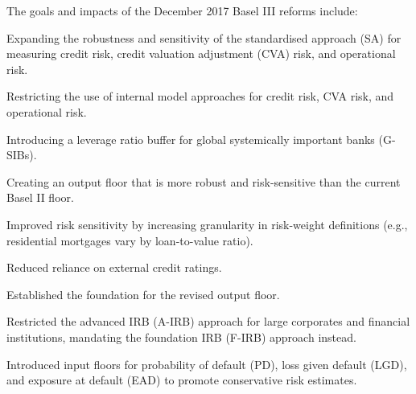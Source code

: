 

The goals and impacts of the December 2017 Basel III reforms include:

\begin{lettered}
\item Expanding the robustness and sensitivity of the standardised approach (SA)
for measuring credit risk, credit valuation adjustment (CVA) risk, and
operational risk.
\item Restricting the use of internal model approaches for credit risk, CVA risk,
and operational risk.
\item Introducing a leverage ratio buffer for global systemically important banks
(G-SIBs).
\item Creating an output floor that is more robust and risk-sensitive than the
current Basel II floor.
\end{lettered}


\begin{lettered}
\item Improved risk sensitivity by increasing granularity in risk-weight
definitions (e.g., residential mortgages vary by loan-to-value ratio).
\item Reduced reliance on external credit ratings.
\item Established the foundation for the revised output floor.
\end{lettered}

\begin{lettered}
\item Restricted the advanced IRB (A-IRB) approach for large corporates and
financial institutions, mandating the foundation IRB (F-IRB) approach instead.
\item Introduced input floors for probability of default (PD), loss given default
(LGD), and exposure at default (EAD) to promote conservative risk estimates.
\end{lettered}

